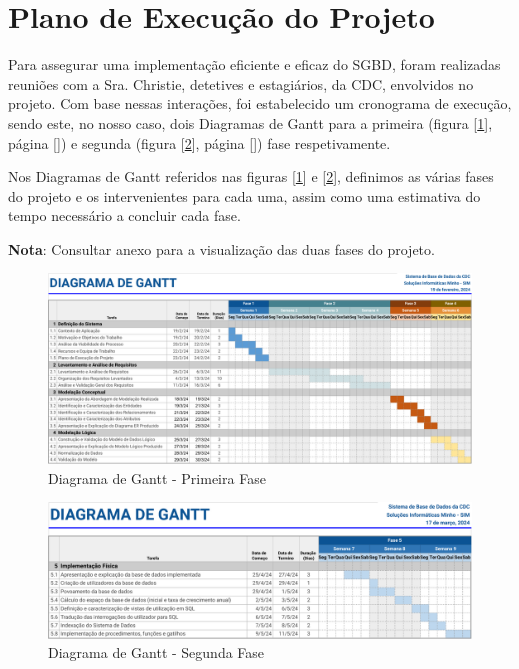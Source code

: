 \documentclass[a4paper,12pt]{scrreprt}
\begin{document}
    \clearpage

    \section{Plano de Execução do Projeto}
        Para assegurar uma implementação eficiente e eficaz do SGBD, foram realizadas reuniões com a Sra$.$ Christie, detetives e estagiários, da CDC, envolvidos no projeto. Com base nessas interações, foi estabelecido um cronograma de execução, sendo este, no nosso caso, dois Diagramas de Gantt para a primeira (figura [\ref{fig:1.1}], página [\pageref{fig:1.1}]) e segunda (figura [\ref{fig:1.2}], página [\pageref{fig:1.2}]) fase respetivamente.

        Nos Diagramas de Gantt referidos nas figuras [\ref{fig:1.1}] e [\ref{fig:1.2}], definimos as várias fases do projeto e os intervenientes para cada uma, assim como uma estimativa do tempo necessário a concluir cada fase.
        
        \textbf{Nota}: Consultar anexo \textit{} para a visualização das duas fases do projeto.

        \begin{figure}
            \centering
            \includegraphics[scale=0.99, angle=270]{images/gantt1.pdf}
            \caption{Diagrama de Gantt - Primeira Fase}
            \label{fig:1.1}
        \end{figure}

        \begin{figure}
            \centering
            \includegraphics[scale=0.99, angle=270]{images/gantt2.pdf}
            \caption{Diagrama de Gantt - Segunda Fase}
            \label{fig:1.2}
        \end{figure}
\end{document}
